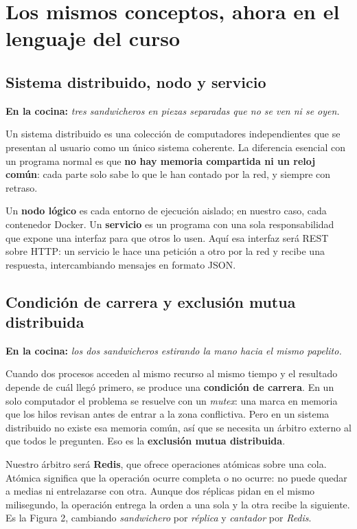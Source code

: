 \documentclass[11pt,a4paper]{article}
\newcommand{\cocina}[1]{%
  \vspace{1pt}%
  {\small\color{usachteal}\textbf{En la cocina:} \textit{#1}}\par\vspace{1pt}}
\begin{document}
\section{Los mismos conceptos, ahora en el lenguaje del curso}

\subsection{Sistema distribuido, nodo y servicio}

\cocina{tres sandwicheros en piezas separadas que no se ven ni se oyen.}

Un sistema distribuido es una colección de computadores independientes que se presentan al usuario como un único sistema coherente. La diferencia esencial con un programa normal es que \textbf{no hay memoria compartida ni un reloj común}: cada parte solo sabe lo que le han contado por la red, y siempre con retraso.

Un \textbf{nodo lógico} es cada entorno de ejecución aislado; en nuestro caso, cada contenedor Docker. Un \textbf{servicio} es un programa con una sola responsabilidad que expone una interfaz para que otros lo usen. Aquí esa interfaz será REST sobre HTTP: un servicio le hace una petición a otro por la red y recibe una respuesta, intercambiando mensajes en formato JSON.

\subsection{Condición de carrera y exclusión mutua distribuida}

\cocina{los dos sandwicheros estirando la mano hacia el mismo papelito.}

Cuando dos procesos acceden al mismo recurso al mismo tiempo y el resultado depende de cuál llegó primero, se produce una \textbf{condición de carrera}. En un solo computador el problema se resuelve con un \emph{mutex}: una marca en memoria que los hilos revisan antes de entrar a la zona conflictiva. Pero en un sistema distribuido no existe esa memoria común, así que se necesita un árbitro externo al que todos le pregunten. Eso es la \textbf{exclusión mutua distribuida}.

Nuestro árbitro será \textbf{Redis}, que ofrece operaciones atómicas sobre una cola. Atómica significa que la operación ocurre completa o no ocurre: no puede quedar a medias ni entrelazarse con otra. Aunque dos réplicas pidan en el mismo milisegundo, la operación entrega la orden a una sola y la otra recibe la siguiente. Es la Figura 2, cambiando \emph{sandwichero} por \emph{réplica} y \emph{cantador} por \emph{Redis}.
\end{document}
